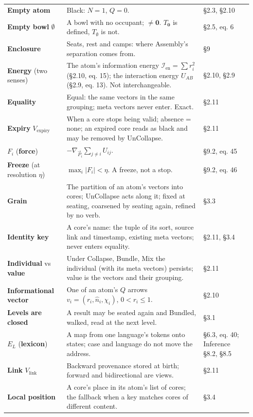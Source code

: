 \documentclass[10.5pt]{article}
\begin{document}
{\begin{longtable}{L{3.6cm}L{10.9cm}L{1.8cm}}
\textbf{Empty atom} & Black: $N=1$, $Q=0$. & §2.3, §2.10 \\
\textbf{Empty bowl} $\emptyset$ & A bowl with no occupant; $\neq\mathbf0$. $T_{\mathbf0}$ is defined, $T_\emptyset$ is not. & §2.5, eq. 6 \\
\textbf{Enclosure} & Seats, rest and camps: where Assembly's separation comes from. & §9 \\
\textbf{Energy} (two senses) & The atom's information energy $\mathcal{I}_{\mathrm{en}}=\sum r_i^2$ (§2.10, eq. 15); the interaction energy $U_{AB}$ (§2.9, eq. 13). Not interchangeable. & §2.10, §2.9 \\
\textbf{Equality} & Equal: the same vectors in the same grouping; meta vectors never enter. Exact. & §2.11 \\
\textbf{Expiry} $V_{\text{expiry}}$ & When a core stops being valid; absence = none; an expired core reads as black and may be removed by UnCollapse. & §2.11 \\
$F_i$ (\textbf{force}) & $-\nabla_{\vec P_i}\sum_{j\neq i}U_{ij}$. & §9.2, eq. 45 \\
\textbf{Freeze} (at resolution $\eta$) & $\max_i\lvert F_i\rvert<\eta$. A freeze, not a stop. & §9.2, eq. 46 \\
\textbf{Grain} & The partition of an atom's vectors into cores; UnCollapse acts along it; fixed at seating, coarsened by seating again, refined by no verb. & §3.3 \\
\textbf{Identity key} & A core's name: the tuple of its sort, source link and timestamp, existing meta vectors; never enters equality. & §2.11, §3.4 \\
\textbf{Individual} vs \textbf{value} & Under Collapse, Bundle, Mix the individual (with its meta vectors) persists; value is the vectors and their grouping. & §2.11 \\
\textbf{Informational vector} & One of an atom's $Q$ arrows $v_i=(r_i,\hat n_i,\chi_i)$, $0<r_i\le1$. & §2.10 \\
\textbf{Levels are closed} & A result may be seated again and Bundled, walked, read at the next level. & §3.1 \\
$E_L$ (\textbf{lexicon}) & A map from one language's tokens onto states; case and language do not move the address. & §6.3, eq. 40; Inference §8.2, §8.5 \\
\textbf{Link} $V_{\text{link}}$ & Backward provenance stored at birth; forward and bidirectional are views. & §2.11 \\
\textbf{Local position} & A core's place in its atom's list of cores; the fallback when a key matches cores of different content. & §3.4 \\

\end{longtable}}
\end{document}
